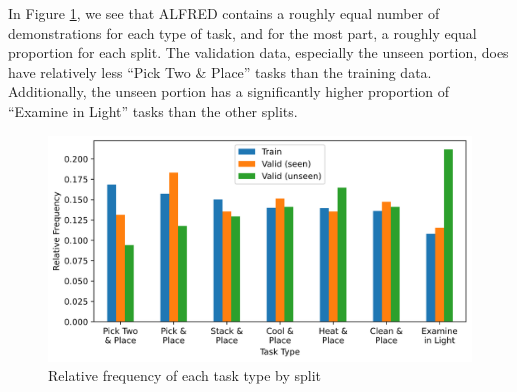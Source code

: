 \documentclass[11pt,a4paper]{article}
\begin{document}
In Figure \ref{fig:task-type}, we see that ALFRED contains a roughly equal number of demonstrations for each type of task, and for the most part, a roughly equal proportion for each split. The validation data, especially the unseen portion, does have relatively less ``Pick Two \& Place'' tasks than the training data. Additionally, the unseen portion has a significantly higher proportion of ``Examine in Light'' tasks than the other splits.

\begin{figure}[H]
\centering
\includegraphics[scale=0.33]{figures/task_type_freqs.png}
\caption{Relative frequency of each task type by split}
\label{fig:task-type}
\end{figure}
\end{document}
